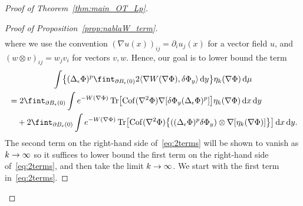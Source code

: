 \documentclass[AHL,Unicode,longabstracts]{cedram}
\DeclareMathOperator{\Tr}{Tr}
\DeclareMathOperator{\Cof}{Cof}
\newcommand{\W}{W}
\newcommand{\source}{\mu}
\newcommand*\diff{\mathop{}\!\mathrm{d}}
\newcommand{\OT}{\Phi}
\newcommand{\avgint}{\fint}
\newcommand{\findiff}{\delta\OT}
\renewcommand*{\to}{\mathchoice{\longrightarrow}{\rightarrow}{\rightarrow}{\rightarrow}}
\let\originalleft\left
\let\originalright\right
\renewcommand{\left}{\mathopen{}\mathclose\bgroup\originalleft}
\renewcommand{\right}{\aftergroup\egroup\originalright}
\begin{document}
\begin{proof}[Proof of Theorem~\ref{thm:main_OT_Lp}]
\begin{proof}[Proof of Proposition~\ref{prop:nablaW_term}]
\begin{multline*}
\end{multline*}
where we use the convention $(\nabla u(x))_{ij}=\partial_iu_j(x)$ for a vector field $u$, and $(w\otimes v)_{ij}=w_jv_i$ for vectors $v,w$. Hence, our goal is to lower bound the term
\begin{multline}\label{eq:2terms}
\int\left\{ (\Delta_{\epsilon}\OT)^p\avgint_{\partial B_{\epsilon}(0)}2\langle \nabla\W(\nabla \OT),\findiff_y\rangle\diff y\right\}\eta_k(\nabla\OT)\diff \source\\
\begin{aligned}
&=2\avgint_{\partial B_{\epsilon}(0)}\int e^{-\W(\nabla\OT)} \Tr\left[\Cof(\nabla^2\OT)\nabla[\findiff_y(\Delta_{\epsilon}\OT)^p]\right]\eta_k(\nabla\OT)\diff x\diff y\\
&\quad+2\avgint_{\partial B_{\epsilon}(0)}\int e^{-\W(\nabla\OT)} \Tr\left[\Cof(\nabla^2\OT)\bigl\{\left((\Delta_{\epsilon}\OT)^p\findiff_y\right)\otimes\nabla[\eta_k(\nabla\OT)]\bigr\}\right]\diff x\diff y.
\end{aligned}
\end{multline}
The second term on the right-hand side of~\eqref{eq:2terms} will be shown to vanish as $k\to\infty$ so it suffices to lower bound the first term on the right-hand side of~\eqref{eq:2terms}, and then take the limit $k\to \infty$. We start with the first term in~\eqref{eq:2terms}.


\end{proof}
\end{proof}
\end{document}
